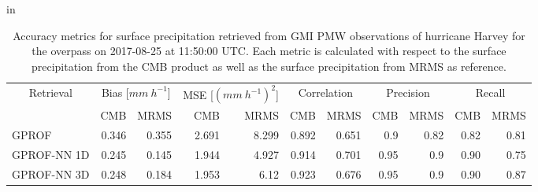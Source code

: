\begin{itemize}
\begin{change}[420]
  \end{change}


    \begin{change}[439]

    in 

    \DIFaddend 
    \end{change}



 \end{itemize}

\begin{table}[hbpt]
  \caption{Accuracy metrics for surface precipitation retrieved from GMI PMW
    observations of hurricane Harvey for the overpass on 2017-08-25 at 11:50:00
    UTC. Each metric is calculated with respect to the surface precipitation from
    the CMB product as well as  the surface precipitation
    from MRMS as reference.}
  \label{tab:harvey_gmi}
  \centering
  \begin{tabular}{|l||rr|rr|rr|rr|rr|}
    \hline
    \multicolumn{1}{|c||}{Retrieval} &
    \multicolumn{2}{c|}{Bias [$\unit{mm\ h^{-1}}$]} &
    \multicolumn{2}{c|}{MSE [$(\unit{mm\ h^{-1}})^2$]} &
    \multicolumn{2}{c|}{Correlation} &
    \multicolumn{2}{c|}{Precision} & \multicolumn{2}{c|}{Recall}\\
    & CMB & MRMS & CMB & MRMS & CMB & MRMS & CMB & MRMS & CMB & MRMS\\
    \hline
    \hline
    GPROF       & 0.346 & 0.355 & 2.691 & 8.299 & 0.892 & 0.651 & 0.9 & 0.82 & 0.82 & 0.81 \\
    GPROF-NN 1D & 0.245 & 0.145 & 1.944 & 4.927 & 0.914 & 0.701 & 0.95 & 0.9 & 0.90 & 0.75 \\
    GPROF-NN 3D & 0.248 & 0.184 & 1.953 & 6.12  & 0.923 & 0.676 & 0.95 & 0.9 & 0.90 & 0.87 \\
    \hline
    \end{tabular}
  \end{table}

